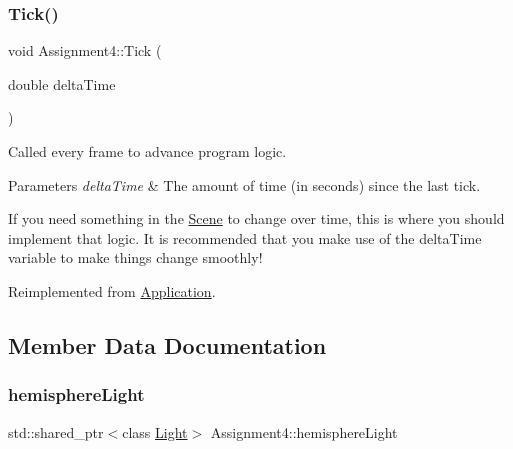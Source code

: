 \hypertarget{class_assignment4_a3ef3fef7a6ae13603bc453b29e079c5d}{}\label{class_assignment4_a3ef3fef7a6ae13603bc453b29e079c5d}
\subsubsection{\texorpdfstring{Tick()}{Tick()}}
{\footnotesize\ttfamily void Assignment4\+::\+Tick (\begin{DoxyParamCaption}\item[{double}]{delta\+Time }\end{DoxyParamCaption})\hspace{0.3cm}{\ttfamily [virtual]}}



Called every frame to advance program logic.


\begin{DoxyParams}{Parameters}
{\em delta\+Time} & The amount of time (in seconds) since the last tick.\\
\hline
\end{DoxyParams}
If you need something in the \hyperlink{class_scene}{Scene} to change over time, this is where you should implement that logic. It is recommended that you make use of the delta\+Time variable to make things change smoothly!

Reimplemented from \hyperlink{class_application_a0800afd5651153d31fa775a8048d14dd}{Application}.



\subsection{Member Data Documentation}
\hypertarget{class_assignment4_a2ea813219380cc65ef89749586f5d4b5}{}\label{class_assignment4_a2ea813219380cc65ef89749586f5d4b5}
\subsubsection{\texorpdfstring{hemisphere\+Light}{hemisphereLight}}
{\footnotesize\ttfamily std\+::shared\+\_\+ptr$<$class \hyperlink{class_light}{Light}$>$ Assignment4\+::hemisphere\+Light\hspace{0.3cm}{\ttfamily [private]}}

\hypertarget{class_assignment4_a327ee7158090e2a2db8763df3cb8608d}{}\label{class_assignment4_a327ee7158090e2a2db8763df3cb8608d}
